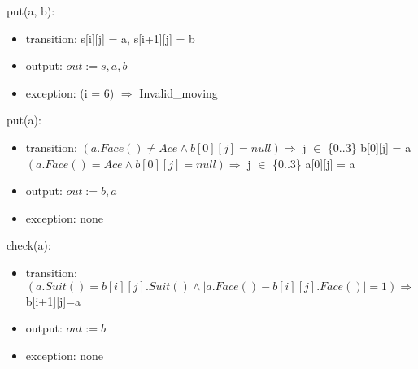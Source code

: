 \documentclass[12pt]{article}
\begin{document}
put(a, b):
\begin{itemize}
	\item transition:
	s[i][j] = a, s[i+1][j] = b
	
	\item output: 
	$out := s,a, b$
	\item exception:
	(i = 6) $\Rightarrow$ Invalid\_moving
\end{itemize}

put(a):
\begin{itemize}
	\item transition:
	$(a.Face() \neq Ace \land b[0][j]=null) \Rightarrow$ j $\in$ \{0..3\} b[0][j] = a\\
	$(a.Face() = Ace \land b[0][j]=null) \Rightarrow$ j $\in$ \{0..3\} a[0][j] = a
	\item output: 
	$out := b, a $
	\item exception:
	none
\end{itemize}

check(a):
\begin{itemize}
	\item transition:
	$(a.Suit() = b[i][j].Suit() \land |a.Face()-b[i][j].Face()|=1) \Rightarrow$ b[i+1][j]=a
	\item output: 
	$out := b$
	\item exception:
	none
\end{itemize}
\end{document}
